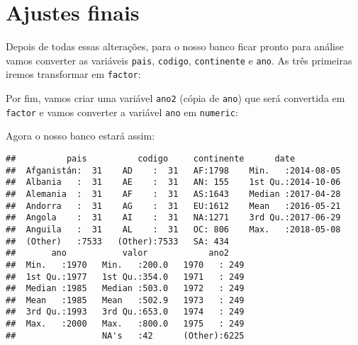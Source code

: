 \documentclass[]{book}
\newenvironment{Shaded}{\begin{snugshade}}{\end{snugshade}}
\newcommand{\KeywordTok}[1]{\textcolor[rgb]{0.13,0.29,0.53}{\textbf{#1}}}
\newcommand{\NormalTok}[1]{#1}
\newcommand{\OperatorTok}[1]{\textcolor[rgb]{0.81,0.36,0.00}{\textbf{#1}}}
\newcommand{\StringTok}[1]{\textcolor[rgb]{0.31,0.60,0.02}{#1}}
\theoremstyle{definition}
\theoremstyle{definition}
\theoremstyle{definition}
\theoremstyle{remark}
\begin{document}
\hypertarget{ajustes-finais}{%
\section{Ajustes finais}\label{ajustes-finais}}

Depois de todas essas alterações, para o nosso banco ficar pronto para análise vamos converter as variáveis \texttt{pais}, \texttt{codigo}, \texttt{continente} e \texttt{ano}. As três primeiras iremos transformar em \texttt{factor}:

\begin{Shaded}
\end{Shaded}

Por fim, vamos criar uma variável \texttt{ano2} (cópia de \texttt{ano}) que será convertida em \texttt{factor} e vamos converter a variável \texttt{ano} em \texttt{numeric}:

\begin{Shaded}
\end{Shaded}

Agora o nosso banco estará assim:

\begin{verbatim}
##          pais          codigo     continente      date           
##  Afganistán:  31    AD    :  31   AF:1798    Min.   :2014-08-05  
##  Albania   :  31    AE    :  31   AN: 155    1st Qu.:2014-10-06  
##  Alemania  :  31    AF    :  31   AS:1643    Median :2017-04-28  
##  Andorra   :  31    AG    :  31   EU:1612    Mean   :2016-05-21  
##  Angola    :  31    AI    :  31   NA:1271    3rd Qu.:2017-06-29  
##  Anguila   :  31    AL    :  31   OC: 806    Max.   :2018-05-08  
##  (Other)   :7533   (Other):7533   SA: 434                        
##       ano           valor            ano2     
##  Min.   :1970   Min.   :200.0   1970   : 249  
##  1st Qu.:1977   1st Qu.:354.0   1971   : 249  
##  Median :1985   Median :503.0   1972   : 249  
##  Mean   :1985   Mean   :502.9   1973   : 249  
##  3rd Qu.:1993   3rd Qu.:653.0   1974   : 249  
##  Max.   :2000   Max.   :800.0   1975   : 249  
##                 NA's   :42      (Other):6225
\end{verbatim}
\end{document}
